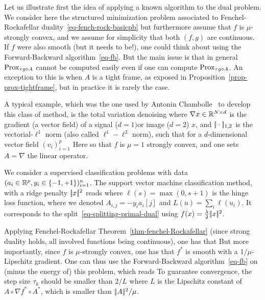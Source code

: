 Let us illustrate first the idea of applying a known algorithm to the dual problem. We consider here the structured minimization problem associated to Fenchel-Rockafellar duality~\eqref{eq-fench-rock-basicpb}
but furthermore assume that $f$ is $\mu$-strongly convex, and we assume for simplicity that both $(f,g)$ are continuous. If $f$ were also smooth (but it needs to be!), one could think about using the Forward-Backward algorithm~\eqref{eq-fb}. But the main issue is that in general $\operatorname{Prox}_{\tau g \circ A}$ cannot be computed easily even if one can compute $\operatorname{Prox}_{\tau g \circ A}$. An exception to this is when $A$ is a tight frame, as exposed in Proposition~\ref{prop-prox-tightframe}, but in practice it is rarely the case. 

\begin{exmp}[TV denoising]
A typical example, which was the one used by Antonin Chambolle~\cite{chambolle-algo-tv} to develop this class of method, is the total variation denoising
where $\nabla x \in \mathbb{R}^{N \times d}$ is the gradient (a vector field) of a signal ($d=1) $or image ($d=2$) $x$, and $|\!| \cdot |\!|_{1,2}$ is the vectorial-$\ell^1$ norm (also called $\ell^1-\ell^2$ norm), such that for a $d$-dimensional vector field $(v_i)_{i=1}^p$ 
Here 
so that $f$ is $\mu=1$ strongly convex, and one sets $A=\nabla$ the linear operator.
\end{exmp}

\begin{exmp}
	We consider a supervised classification problems with data $(a_i \in \mathbb{R}^p, y_i \in \{-1,+1\})_{i=1}^n$. 
	The support vector machine classification method, with a ridge penalty $|\!| x |\!|^2$ reads
	where $\ell(s) = \max(0,s+1)$ is the hinge loss function, where
	we denoted $A_{i,j}=-y_i a_i[j]$ and $L(u)=\sum_i \ell(u_i)$. 
	It corresponds to the split~\eqref{eq-splitting-primal-dual} using $f(x) = \frac{\lambda}{2}|\!| x |\!|^2$. 
\end{exmp}


Applying Fenchel-Rockafellar Theorem~\ref{thm-fenchel-Rockafellar} (since strong duality holds, all involved functions being continuous), one has that 
But more importantly, since $f$ is $\mu$-strongly convex, one has that $f^*$ is smooth with a $1/\mu$-Lipschitz gradient. One can thus use the Forward-Backward algorithm~\eqref{eq-fb} on (minus the energy of) this problem, which reads
To guarantee convergence, the step size $\tau_k$ should be smaller than $2/L$ where $L$ is the Lipschitz constant of $A \circ \nabla f^* \circ A^*$, which is smaller than $|\!| A |\!|^2/\mu$. 

